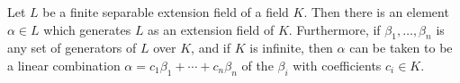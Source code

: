 Let $L$ be a finite separable extension field of a field $K$. Then there is an element $\alpha \in L$ which generates $L$ as an extension field of $K$. Furthermore, if $\beta_1, \ldots, \beta_n$ is any set of generators of $L$ over $K$, and if $K$ is infinite, then $\alpha$ can be taken to be a linear combination $\alpha = c_1\beta_1 + \cdots + c_n\beta_n$ of the $\beta_i$ with coefficients $c_i \in K$.
